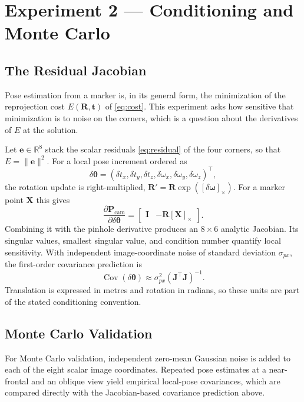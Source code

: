 \documentclass[11pt,a4paper]{article}
\theoremstyle{definition}
\theoremstyle{plain}
\theoremstyle{remark}
\newcommand{\R}{\mathbb{R}}
\newcommand{\Pcam}{\mathbf{P}_{\text{cam}}}
\begin{document}
\section{Experiment 2 --- Conditioning and Monte Carlo}
\label{sec:experiment2}

\subsection{The Residual Jacobian}

Pose estimation from a marker is, in its general form, the minimization of the
reprojection cost $E(\mathbf{R},\mathbf{t})$ of \eqref{eq:cost}. This experiment
asks how sensitive that minimization is to noise on the corners, which is a
question about the derivatives of $E$ at the solution.

Let $\mathbf{e}\in\R^{8}$ stack the scalar residuals \eqref{eq:residual} of the
four corners, so that $E = \|\mathbf{e}\|^2$. For a local pose increment
ordered as
\begin{equation}
  \delta\boldsymbol{\theta} =
  (\delta t_x,\delta t_y,\delta t_z,
   \delta\omega_x,\delta\omega_y,\delta\omega_z)^\top,
\end{equation}
the rotation update is right-multiplied,
$\mathbf{R}'=\mathbf{R}\exp([\delta\boldsymbol{\omega}]_\times)$. For a
marker point $\mathbf{X}$ this gives
\begin{equation}
 \frac{\partial \Pcam}{\partial \delta\boldsymbol{\theta}}
 = \begin{bmatrix}\mathbf{I} & -\mathbf{R}[\mathbf{X}]_\times\end{bmatrix}.
\end{equation}
Combining it with the pinhole derivative produces an $8\times6$ analytic
Jacobian. Its singular values, smallest singular value, and condition number
quantify local sensitivity. With independent image-coordinate noise of
standard deviation $\sigma_{px}$, the first-order covariance prediction is
\begin{equation}
  \operatorname{Cov}(\delta\boldsymbol{\theta})
  \approx \sigma_{px}^2(\mathbf{J}^\top\mathbf{J})^{-1}.
\end{equation}
Translation is expressed in metres and rotation in radians, so these units
are part of the stated conditioning convention.

\subsection{Monte Carlo Validation}

For Monte Carlo validation, independent zero-mean Gaussian noise is added to
each of the eight scalar image coordinates. Repeated pose estimates at a
near-frontal and an oblique view yield empirical local-pose covariances, which
are compared directly with the Jacobian-based covariance prediction above.
\end{document}
